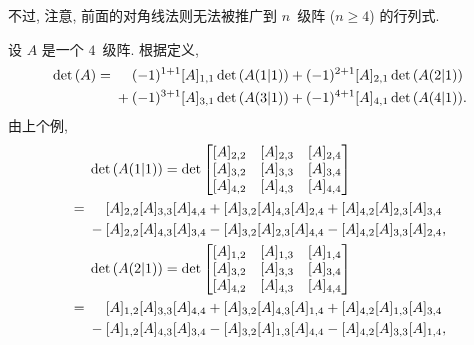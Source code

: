 \documentclass[../libro.tex]{subfiles}
\begin{document}
不过, 注意,
前面的对角线法则无法被推广到
\(n\)~级阵 (\(n \geq 4\)) 的行列式.

\begin{example}\label{emp:DetOfSquareMatrixOfSize4}
    设 \(A\) 是一个 \(4\)~级阵.
    根据定义,
    \begin{align*}
        \det {(A)}
        = {} &
        \hphantom{{} + {}}
        (-1)^{1+1} [A]_{1,1} \det {(A(1|1))}
        + (-1)^{2+1} [A]_{2,1} \det {(A(2|1))}
        \\
        &
        + (-1)^{3+1} [A]_{3,1} \det {(A(3|1))}
        + (-1)^{4+1} [A]_{4,1} \det {(A(4|1))}.
    \end{align*}
    由上个例,
    \begin{align*}
        &
        \det {(A(1|1))}
        = \det {
            \begin{bmatrix}
                [A]_{2,2} & [A]_{2,3} & [A]_{2,4} \\
                [A]_{3,2} & [A]_{3,3} & [A]_{3,4} \\
                [A]_{4,2} & [A]_{4,3} & [A]_{4,4} \\
            \end{bmatrix}
        }
        \\
        = {} &
        \hphantom{{} + {}}
        [A]_{2,2} [A]_{3,3} [A]_{4,4}
        + [A]_{3,2} [A]_{4,3} [A]_{2,4}
        + [A]_{4,2} [A]_{2,3} [A]_{3,4}
        \\
        &
        - [A]_{2,2} [A]_{4,3} [A]_{3,4}
        - [A]_{3,2} [A]_{2,3} [A]_{4,4}
        - [A]_{4,2} [A]_{3,3} [A]_{2,4},
        \\
        &
        \det {(A(2|1))}
        = \det {
            \begin{bmatrix}
                [A]_{1,2} & [A]_{1,3} & [A]_{1,4} \\
                [A]_{3,2} & [A]_{3,3} & [A]_{3,4} \\
                [A]_{4,2} & [A]_{4,3} & [A]_{4,4} \\
            \end{bmatrix}
        }
        \\
        = {} &
        \hphantom{{} + {}}
        [A]_{1,2} [A]_{3,3} [A]_{4,4}
        + [A]_{3,2} [A]_{4,3} [A]_{1,4}
        + [A]_{4,2} [A]_{1,3} [A]_{3,4}
        \\
        &
        - [A]_{1,2} [A]_{4,3} [A]_{3,4}
        - [A]_{3,2} [A]_{1,3} [A]_{4,4}
        - [A]_{4,2} [A]_{3,3} [A]_{1,4},

\end{align*}
\end{example}
\end{document}
